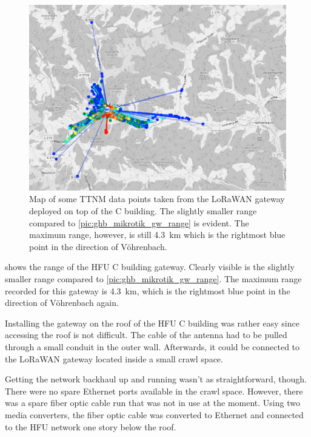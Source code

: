 \begin{figure}[htbp]
    \centering
    \includegraphics[width=1\textwidth]{pictures/ttn-mapper/gateway-ranges/c_building_gw_range.png}
    \caption{
        Map of some \ac{TTNM} data points taken from the \ac{LoRaWAN} gateway deployed on top of the C building.
        The slightly smaller range compared to \cref{pic:ghb_mikrotik_gw_range} is evident.
        The maximum range, however, is still \SI{4.3}{\kilo\meter} which is the rightmost blue point in the direction of Vöhrenbach.
    }\label{pic:c_building_gw_range}
\end{figure}

 shows the range of the \ac{HFU} C building gateway.
Clearly visible is the slightly smaller range compared to \cref{pic:ghb_mikrotik_gw_range}.
The maximum range recorded for this gateway is \SI{4.3}{\kilo\meter}, which is the rightmost blue point in the direction of Vöhrenbach again.

Installing the gateway on the roof of the \ac{HFU} C building was rather easy since accessing the roof is not difficult.
The cable of the antenna had to be pulled through a small conduit in the outer wall.
Afterwards, it could be connected to the \ac{LoRaWAN} gateway located inside a small crawl space.

Getting the network backhaul up and running wasn't as straightforward, though.
There were no spare Ethernet ports available in the crawl space.
However, there was a spare fiber optic cable run that was not in use at the moment.
Using two media converters, the fiber optic cable was converted to Ethernet and connected to the \ac{HFU} network one story below the roof.


